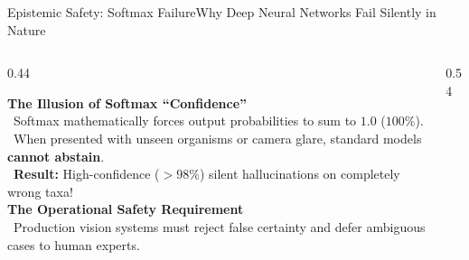 \documentclass[aspectratio=169,10pt]{beamer}
\begin{document}
\begin{frame}{Epistemic Safety: Softmax Failure}{Why Deep Neural Networks Fail Silently in Nature}
    \begin{columns}[T]
        \begin{column}{0.44\textwidth}
            \begin{card}
                \textbf{\color{RoseAccent} The Illusion of Softmax ``Confidence''}\\[4pt]
                \textbullet\ Softmax mathematically forces output probabilities to sum to $1.0$ ($100\%$).\\[4pt]
                \textbullet\ When presented with unseen organisms or camera glare, standard models \textbf{cannot abstain}.\\[4pt]
                \textbullet\ \textbf{Result:} High-confidence ($>98\%$) silent hallucinations on completely wrong taxa!\\[8pt]
                \textbf{\color{BlueAccent} The Operational Safety Requirement}\\[3pt]
                \textbullet\ Production vision systems must reject false certainty and defer ambiguous cases to human experts.
            \end{card}
        \end{column}
        
        \begin{column}{0.54\textwidth}
            \centering
\end{column}
\end{columns}
\end{frame}
\end{document}

